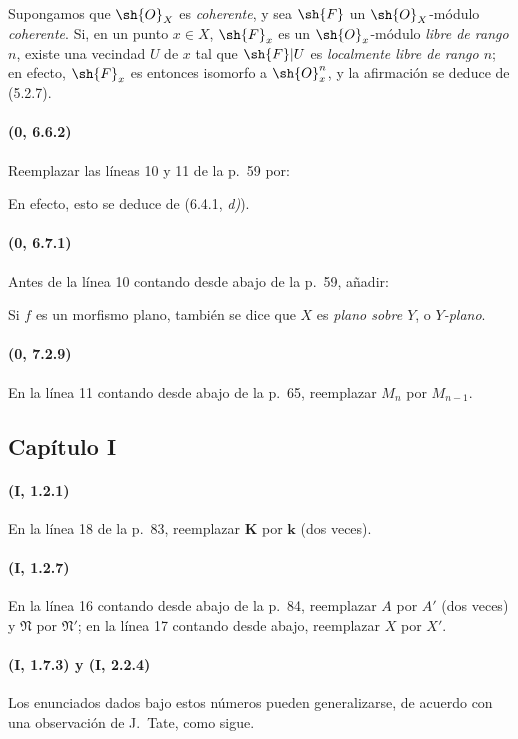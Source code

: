 \documentclass[oneside,10pt]{amsart}
\begin{document}
Supongamos que $\sh{O}_X$ es \emph{coherente}, y sea $\sh{F}$ un
$\sh{O}_X$-módulo \emph{coherente}. Si, en un punto $x\in X$, $\sh{F}_x$ es
un $\sh{O}_x$-módulo \emph{libre de rango $n$}, existe una vecindad $U$ de $x$
tal que $\sh{F}|U$ es \emph{localmente libre de rango $n$}; en efecto,
$\sh{F}_x$ es entonces isomorfo a $\sh{O}_x^n$, y la afirmación se
deduce de (5.2.7).

\paragraph{(0, 6.6.2)}
Reemplazar las líneas 10 y 11 de la p.~59 por:

En efecto, esto se deduce de (6.4.1, \emph{d)}).

\paragraph{(0, 6.7.1)}
Antes de la línea 10 contando desde abajo de la p.~59, añadir:

Si $f$ es un morfismo plano, también se dice que $X$ es
\emph{plano sobre $Y$}, o \emph{$Y$-plano}.

\paragraph{(0, 7.2.9)}
En la línea 11 contando desde abajo de la p.~65, reemplazar $M_n$ por
$M_{n-1}$.

\subsection*{Capítulo I}

\paragraph{(I, 1.2.1)}
En la línea 18 de la p.~83, reemplazar $\boldsymbol{K}$ por $\boldsymbol{k}$ (dos veces).

\paragraph{(I, 1.2.7)}
En la línea 16 contando desde abajo de la p.~84, reemplazar $A$ por
$A'$ (dos veces) y $\mathfrak N$ por $\mathfrak N'$; en la línea 17 contando desde
abajo, reemplazar $X$ por $X'$.

\paragraph{(I, 1.7.3) y (I, 2.2.4)}
Los enunciados dados bajo estos números pueden generalizarse, de
acuerdo con una observación de J.~Tate, como sigue.
\end{document}
